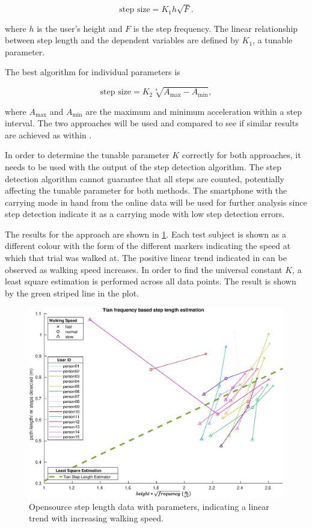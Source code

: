 \begin{equation}
	\label{eq:Tian2016_sle2}
	\text{step size} = K_1 h \sqrt{F}.
\end{equation}


 where $h$ is the user's height and $F$ is the step frequency. The linear relationship between step length and the dependent variables are defined by $ K_1 $, a tunable parameter. \par 
 
 The best algorithm for individual parameters is 
 
 \begin{equation}
 	\text{step size} =K_2 \sqrt[4]{A_{\max }-A_{\min }},
 	\label{eq:weinberg_stepsize2}
 \end{equation}
 
 where $A_{\max}$ and $A_{\min}$ are the maximum and minimum acceleration within a step interval. The two approaches will be used and compared to see if similar results are achieved as within \cite{Vezocnik2019}.

In order to determine the tunable parameter $K$ correctly for both approaches, it needs to be used with the output of the step detection algorithm. The step detection algorithm cannot guarantee that all steps are counted, potentially affecting the tunable parameter for both methods. 
The smartphone with the carrying mode in hand from the online data \cite{Vezocnik2019} will be used for further analysis since step detection indicate it as a carrying mode with low step detection errors. \par

The results for the \citet{Tian2016} approach are shown in \cref{fig:step_length_tian}. Each test subject is shown as a different colour with the form of the different markers indicating the speed at which that trial was walked at. The positive linear trend indicated in \cite{Tian2016} can be observed as walking speed increases. In order to find the universal constant $K$, a least square estimation is performed across all data points. The result is shown by the green striped line in the plot. 

	\begin{figure}[H]
	\centering
	\includegraphics[width=0.8\linewidth]{images/20201113_1634_tian}
	\caption{Opensource step length data with \citet{Tian2016} parameters, indicating a linear trend with increasing walking speed.}
	\label{fig:step_length_tian}
	\end{figure}
	
